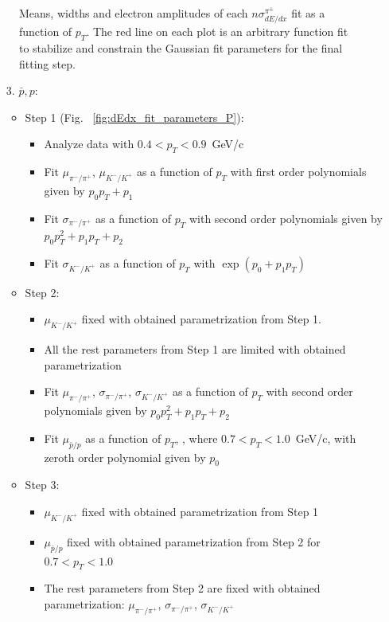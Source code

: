 \begin{figure}[h!]
\begin{subfigure}{.32\textwidth}
	\end{subfigure}
	\begin{minipage}{.64\textwidth}
		\caption[Means, widths and electron amplitudes of each $n\sigma^{\pi^\pm}_{dE/dx}$ fit as a function of $p_T$.]{Means, widths and electron amplitudes of each $n\sigma^{\pi^\pm}_{dE/dx}$ fit as a function of $p_T$.  The red line on each plot is an arbitrary function fit to stabilize and constrain the Gaussian fit parameters for the final fitting step.}
		\label{fig:dEdx_fit_parametersPi}
	\end{minipage}
	
\end{figure}
\begin{enumerate}
	\item[3.] $\bar{p},p$:
	\begin{itemize}
		\item Step 1 (Fig. ~\ref{fig:dEdx_fit_parameters_P}):
		\begin{itemize}
			\renewcommand\labelitemi{--}
			\item Analyze data with $0.4 < p_T < 0.9$~GeV/c
			\item Fit  $\mu_{\pi^-/\pi^+}$, $\mu_{K^-/K^+}$   as a function of $p_T$ with first order polynomials given by $p_0p_T+p_1$ 
			\item Fit  $\sigma_{\pi^-/\pi^+}$  as a function of $p_T$ with second order polynomials given by $p_0p_T^2+p_1p_T+p_2$ 
			\item Fit $\sigma_{K^-/K^+}$ as a function of $p_T$ with $\exp\left(p_0+p_1p_T\right)$
		\end{itemize}
		\item Step 2:
		\begin{itemize}
			\renewcommand\labelitemi{--}
			\item $\mu_{K^-/K^+}$ fixed with obtained parametrization from Step 1.
			\item All the rest parameters from Step 1 are limited with obtained parametrization
			\item Fit  $\mu_{\pi^-/\pi^+}$, $\sigma_{\pi^-/\pi^+}$, $\sigma_{K^-/K^+}$  as a function of $p_T$ with second order polynomials given by $p_0p_T^2+p_1p_T+p_2$ 
			\item Fit  $\mu_{\bar{p}/p}$  as a function of $p_T$, , where $0.7<p_T<1.0$~GeV/c, with zeroth order polynomial given by $p_0$ 
			
		\end{itemize}
		\item Step 3:
		\begin{itemize}
			\renewcommand\labelitemi{--}
			\item  $\mu_{K^-/K^+}$ fixed with obtained parametrization from Step 1
			\item $\mu_{\bar{p}/p}$  fixed with obtained parametrization from Step 2 for $0.7<p_T<1.0$
			\item  The rest parameters from Step 2 are fixed with obtained parametrization: $\mu_{\pi^-/\pi^+}$, $\sigma_{\pi^-/\pi^+}$, $\sigma_{K^-/K^+}$
		\end{itemize}		
	\end{itemize}		
\end{enumerate} 


